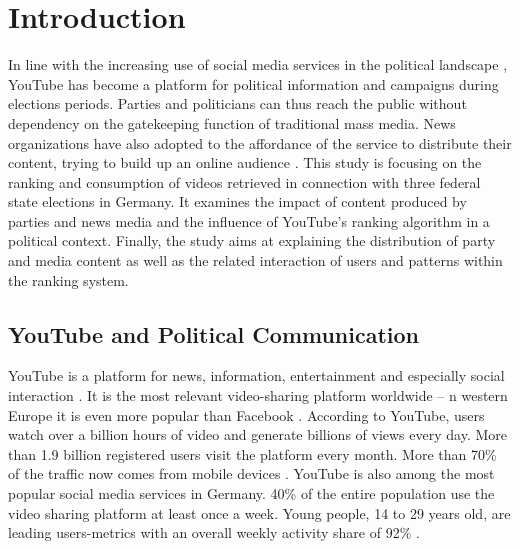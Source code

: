 \documentclass[sigchi, nonacm=true]{acmart}
\begin{document}


\maketitle

\section{Introduction}

  In line with the increasing use of social media services in the political landscape \cite{silber_social_2016}, YouTube has become a platform for political information and campaigns during elections periods. Parties and politicians can thus reach the public without dependency on the gatekeeping function of traditional mass media. News organizations have also adopted to the affordance of the service to distribute their content, trying to build up an online audience \cite{al_nashmi_promoting_2017}. This study is focusing on the ranking and consumption of videos retrieved in connection with three federal state elections in Germany. It examines the impact of content produced by parties and news media and the influence of YouTube’s ranking algorithm in a political context. Finally, the study aims at explaining the distribution of party and media content as well as the related interaction of users and patterns within the ranking system.


\subsection{YouTube and Political Communication}
  YouTube is a platform for news, information, entertainment and especially social interaction \cite{khan_social_2017}. It is the most relevant video-sharing platform worldwide -- n western Europe it is even more popular than Facebook \cite{silber_social_2016}.
  According to YouTube, users watch over a billion hours of video and generate billions of views every day. More than 1.9 billion registered users visit the platform every month. More than 70\% of the traffic now comes from mobile devices \cite{youtube_youtube_2019}. YouTube is also among the most popular social media services in Germany. 40\% of the entire population use the video sharing platform at least once a week. Young people, 14 to 29 years old, are leading users-metrics with an overall weekly activity share of 92\% \cite{ard_ard/zdf-onlinestudie_2019}.
  
\end{document}
